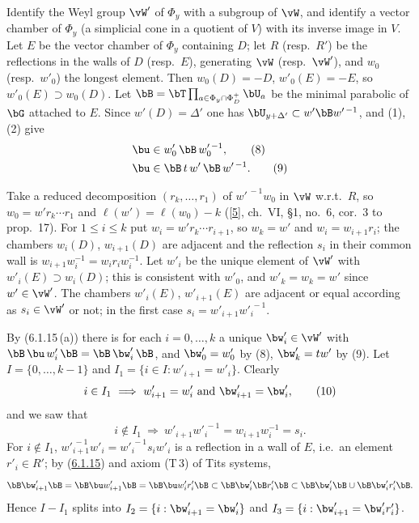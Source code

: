 \documentclass[12pt,a4paper,oneside,english]{smfart}
\newcommand{\btref}[1]{\hyperlink{bt:#1}{#1}}
\newcommand{\btbib}[1]{\hyperlink{bib:#1}{#1}}
\theoremstyle{definition}
\theoremstyle{bt}
\begin{document}
Identify the Weyl group $\vW'$ of $\Phi_y$ with a subgroup of $\vW$, and identify a
vector chamber of $\Phi_y$ (a simplicial cone in a quotient of $V$) with its inverse
image in $V$. Let $E$ be the vector chamber of $\Phi_y$ containing $D$; let $R$
(resp.\ $R'$) be the reflections in the walls of $D$ (resp.\ $E$), generating $\vW$
(resp.\ $\vW'$), and $w_0$ (resp.\ $w'_0$) the longest element. Then $w_0(D)=-D$,
$w'_0(E)=-E$, so $w'_0(E)\supset w_0(D)$. Let $\bB=\bT\prod_{a\in\Phi_y\cap\Phi_D^{+}}\bU_a$
be the minimal parabolic of $\bG$ attached to $E$. Since $w'(D)=\Delta'$ one has
$\bU_{y+\Delta'}\subset w'\bB w'^{\,-1}$, and (1), (2) give
\begin{align}
  \bu&\in w'_0\,\bB\,w'^{\,-1}_0, \tag{8}\\
  \bu&\in \bB\,t\,w'\,\bB\,w'^{\,-1}. \tag{9}
\end{align}

Take a reduced decomposition $(r_k,\dots,r_1)$ of $w'^{\,-1}w_0$ in $\vW$ w.r.t.\
$R$, so $w_0=w'r_k\cdots r_1$ and $\ell(w')=\ell(w_0)-k$ ([\btbib{5}], ch.~VI, \S1, no.~6,
cor.~3 to prop.~17). For $1\leqslant i\leqslant k$ put $w_i=w'r_k\cdots r_{i+1}$, so
$w_k=w'$ and $w_i=w_{i+1}r_i$; the chambers $w_i(D)$, $w_{i+1}(D)$ are adjacent and
the reflection $s_i$ in their common wall is
$w_{i+1}w_i^{-1}=w_ir_iw_i^{-1}$. Let $w'_i$ be the unique element of $\vW'$ with
$w'_i(E)\supset w_i(D)$; this is consistent with $w'_0$, and $w'_k=w_k=w'$ since
$w'\in\vW'$. The chambers $w'_i(E)$, $w'_{i+1}(E)$ are adjacent or equal according
as $s_i\in\vW'$ or not; in the first case $s_i=w'_{i+1}w'^{\,-1}_i$.

By (6.1.15\,(a)) there is for each $i=0,\dots,k$ a unique $\bw'_i\in\vW'$ with
$\bB\,\bu\,w'_i\,\bB=\bB\,\bw'_i\,\bB$, and $\bw'_0=w'_0$ by (8), $\bw'_k=tw'$ by
(9). Let $I=\{0,\dots,k-1\}$ and $I_1=\{i\in I: w'_{i+1}=w'_i\}$. Clearly
\begin{equation}
  i\in I_1\ \Longrightarrow\ w'_{i+1}=w'_i\ \text{and}\ \bw'_{i+1}=\bw'_i, \tag{10}
\end{equation}
and we saw that
\begin{equation}
  i\notin I_1\ \Longrightarrow\ w'_{i+1}w'^{\,-1}_i=w_{i+1}w_i^{-1}=s_i. \tag{11}
\end{equation}
For $i\notin I_1$, $w'^{\,-1}_{i+1}w'_i=w'^{\,-1}_is_iw'_i$ is a reflection in a
wall of $E$, i.e.\ an element $r'_i\in R'$; by (\btref{6.1.15}) and axiom (T\,3) of Tits
systems,
\[
  \bB\bw'_{i+1}\bB=\bB\bu w'_{i+1}\bB=\bB\bu w'_ir'_i\bB
  \subset\bB\bw'_i\bB r'_i\bB\subset\bB\bw'_i\bB\cup\bB\bw'_ir'_i\bB .
\]
Hence $I-I_1$ splits into $I_2=\{i:\bw'_{i+1}=\bw'_i\}$ and
$I_3=\{i:\bw'_{i+1}=\bw'_ir'_i\}$.
\end{document}
